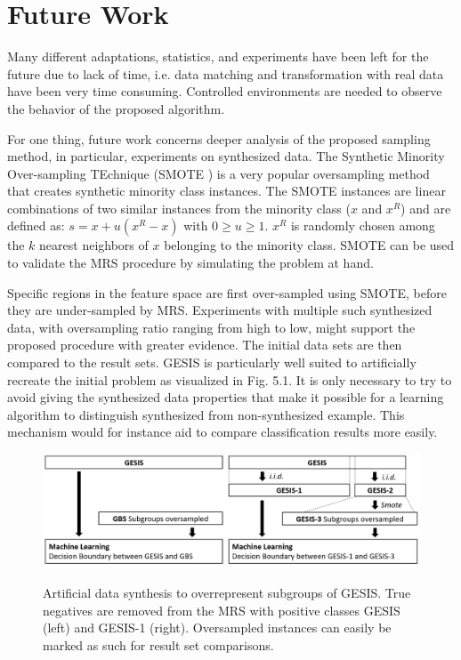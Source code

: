 \chapter{Future Work}

Many different adaptations, statistics, and experiments have been left for the future due to lack of time, i.e. data matching and transformation with real data have been very time consuming. Controlled environments are needed to observe the behavior of the proposed algorithm.

For one thing, future work concerns deeper analysis of the proposed sampling method, in particular, experiments on synthesized data. The Synthetic Minority Over-sampling TEchnique (SMOTE \cite{smote}) is a very popular oversampling method that creates synthetic minority class instances. The SMOTE instances are linear combinations of two similar instances from the minority class (\(x\) and \(x^{R}\)) and are defined as: \(s = x + u (x^{R} - x) \) with \(0 \geq  u \geq 1\). \(x^{R}\) is randomly chosen among the \(k\) nearest neighbors of \(x\) belonging to the minority class. SMOTE can be used to validate the MRS procedure by simulating the problem at hand.

Specific regions in the feature space are first over-sampled using SMOTE, before they are under-sampled by MRS. Experiments with multiple such synthesized data, with oversampling ratio ranging from high to low, might support the proposed procedure with greater evidence. The initial data sets are then compared to the result sets. GESIS is particularly well suited to artificially recreate the initial problem as visualized in Fig. 5.1. It is only necessary to try to avoid giving the synthesized data properties that make it possible for a learning algorithm to distinguish synthesized from non-synthesized example. This mechanism would for instance aid to compare classification results more easily.

\vspace{0.2cm}
\begin{figure}[ht]
	\begin{center}
\captionsetup{width= 410pt}
		\includegraphics[scale=0.38,angle=0]{fig/procedure2}
		\label{std}
		\caption{Artificial data synthesis to overrepresent subgroups of GESIS. True negatives are removed from the MRS with positive classes GESIS (left) and GESIS-1 (right). Oversampled instances can easily be marked as such for result set comparisons.}
	\end{center}
\end{figure}

